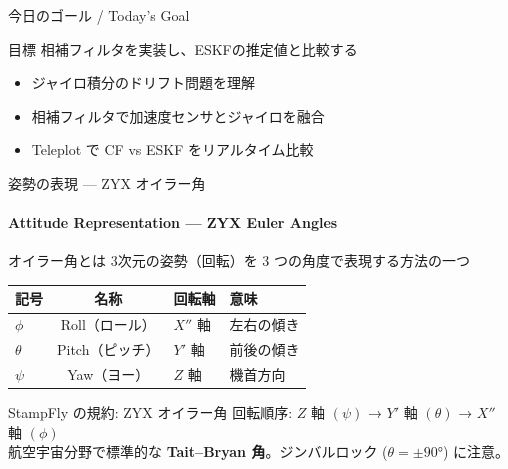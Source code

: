 \begin{frame}{今日のゴール / Today's Goal}
  \begin{block}{目標}
    相補フィルタを実装し、ESKFの推定値と比較する
  \end{block}

  \vspace{1em}

  \begin{itemize}
    \item ジャイロ積分のドリフト問題を理解
    \item 相補フィルタで加速度センサとジャイロを融合
    \item Teleplot で CF vs ESKF をリアルタイム比較
  \end{itemize}
\end{frame}

\begin{frame}{姿勢の表現 --- ZYX オイラー角}
  \framesubtitle{Attitude Representation --- ZYX Euler Angles}

  \begin{block}{オイラー角とは}
    3次元の姿勢（回転）を 3 つの角度で表現する方法の一つ
  \end{block}

  \vspace{0.3em}

  {\small
  \begin{tabular}{lcll}
    \hline
    \textbf{記号} & \textbf{名称} & \textbf{回転軸} & \textbf{意味} \\
    \hline
    $\phi$   & Roll（ロール）  & $X''$ 軸 & 左右の傾き \\
    $\theta$ & Pitch（ピッチ） & $Y'$ 軸  & 前後の傾き \\
    $\psi$   & Yaw（ヨー）     & $Z$ 軸   & 機首方向 \\
    \hline
  \end{tabular}
  }

  \vspace{0.5em}

  \begin{alertblock}{StampFly の規約: ZYX オイラー角}
    {\small
    回転順序: $Z$ 軸 $(\psi)$ → $Y'$ 軸 $(\theta)$ → $X''$ 軸 $(\phi)$\\[2pt]
    航空宇宙分野で標準的な \textbf{Tait--Bryan 角}。ジンバルロック ($\theta = \pm 90°$) に注意。
    }
  \end{alertblock}
\end{frame}


